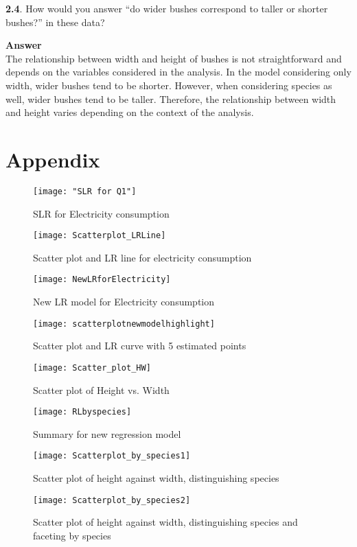 \documentclass[12pt,doublespace]{article}
\begin{document}
	
	\textbf{2.4}. How would you answer “do wider bushes correspond to taller or shorter bushes?” in these data?
	
	\textbf{Answer}\\
	The relationship between width and height of bushes is not straightforward and depends on the variables considered in the analysis. In the model considering only width, wider bushes tend to be shorter. However, when considering species as well, wider bushes tend to be taller. Therefore, the relationship between width and height varies depending on the context of the analysis.
	
	\newpage
	\section {Appendix}
	
	\begin{figure}[h]
		\centering
		\texttt{[image: "SLR for Q1"]}
		\caption{SLR for Electricity consumption}
		\label{fig:slr-for-q1}
	\end{figure}
	
	\begin{figure}
		\centering
		\texttt{[image: Scatterplot\_LRLine]}
		\caption{Scatter plot and LR line for electricity consumption}
		\label{fig:scatterplotlrline}
	\end{figure}
	
	\begin{figure}
	\centering
	\texttt{[image: NewLRforElectricity]}
	\caption{New LR model for Electricity consumption}
	\label{fig:newlrforelectricity}
	\end{figure}

	\begin{figure}
		\centering
		\texttt{[image: scatterplotnewmodelhighlight]}
		\caption{Scatter plot and LR curve with 5 estimated points}
		\label{fig:scatterplotnewmodelhighlight}
	\end{figure}
	
			
	\begin{figure}
		\centering
		\texttt{[image: Scatter\_plot\_HW]}
		\caption{Scatter plot of Height vs. Width}
		\label{fig:scatterplothw}
	\end{figure}
	
	\begin{figure}[h]
		\centering
		\texttt{[image: RLbyspecies]}
		\caption{Summary for new regression model}
		\label{fig:rlbyspecies}
	\end{figure}
	
	\begin{figure}[h]
	\centering
	\texttt{[image: Scatterplot\_by\_species1]}
	\caption{Scatter plot of height against width, distinguishing species}
	\label{fig:scatterplotbyspecies1}
	\end{figure}

	\begin{figure}[h]
		\centering
		\texttt{[image: Scatterplot\_by\_species2]}
		\caption{Scatter plot of height against width, distinguishing species and faceting by species}
		\label{fig:scatterplotbyspecies2}
	\end{figure}
	
\end{document}
